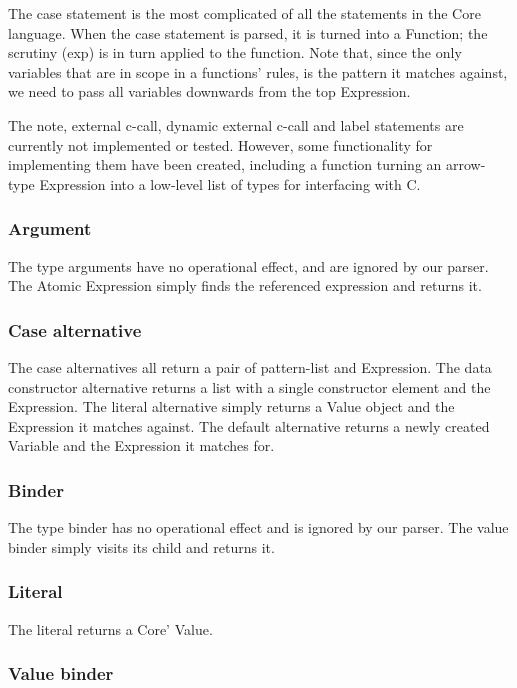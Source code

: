 The case statement is the most complicated of all the statements in the Core language.
When the case statement is parsed, it is turned into a Function; the scrutiny (exp) 
is in turn applied to the function. Note that, since the only variables that are in
scope in a functions' rules, is the pattern it matches against, we need to pass all 
variables downwards from the top Expression.

The note, external c-call, dynamic external c-call and label statements are currently
not implemented or tested. However, some functionality for implementing them have been
created, including a function turning an arrow-type Expression into a low-level list
of types for interfacing with C.

\subsubsection*{Argument}

The type arguments have no operational effect, and are ignored by our parser.
The Atomic Expression simply finds the referenced expression and returns it.

\subsubsection*{Case alternative}

The case alternatives all return a pair of pattern-list and Expression. The
data constructor alternative returns a list with a single constructor element and
the Expression. The literal alternative simply returns a Value object and the 
Expression it matches against. The default alternative returns a newly created
Variable and the Expression it matches for.

\subsubsection*{Binder}

The type binder has no operational effect and is ignored by our parser. The 
value binder simply visits its child and returns it.

\subsubsection*{Literal}

The literal returns a Core' Value.


\subsubsection*{Value binder}

